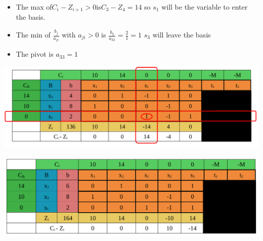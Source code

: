 \vspace{0.25cm}
\begin{itemize}   
\item The max of\hspace{0.2cm}\(C_i - Z_{i+1} > 0\)\hspace{0.2cm}is\hspace{0.2cm}\(C_3 - Z_4 = 14\)\hspace{0.1cm} so \(s_1\) 
will be the variable to enter the basis.
\item The min of \hspace{0.1cm}\(\frac{b_j}{a_{ji}}\)\hspace{0.1cm} with \(a_{ji} > 0\)\hspace{0.1cm} is \hspace{0.1cm} \(\frac{b_3}{a_{33}} = \frac{2}{1} = 1\)\hspace{0.35cm} \(s_3\)
will leave the basis
\item The pivot is \(a_{33} = 1\)
 
\end{itemize}


\vspace{0.25cm}



\begin{center}
    \includegraphics{Chapters/Simplexe/EX/EX6/ex6.6.pdf}
\end{center}

\newpage

\begin{center}
    \includegraphics{Chapters/Simplexe/EX/EX6/ex6.7.pdf}
\end{center}

